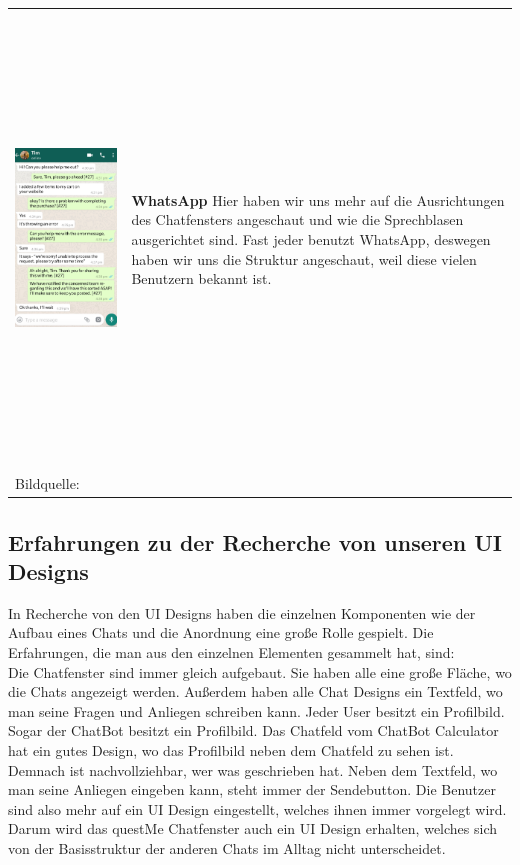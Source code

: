 \begin{tabular}{C{6cm}  L{7cm}}
    \includegraphics[width=\linewidth, height=12cm]{bilder/research pic/Tim Whatsapp.png} & \textbf{WhatsApp} \newline
    Hier haben wir uns mehr auf die Ausrichtungen des Chatfensters angeschaut und wie die Sprechblasen
    ausgerichtet sind. Fast jeder benutzt WhatsApp, deswegen haben wir uns die Struktur angeschaut,
    weil diese vielen Benutzern bekannt ist.                                                                              \\
    Bildquelle:\cite{timwhatsApp} \newline
\end{tabular}

\subsection{Erfahrungen zu der Recherche von unseren UI Designs}
In Recherche von den UI Designs haben die einzelnen Komponenten wie der Aufbau eines Chats und 
die Anordnung eine große Rolle gespielt. Die Erfahrungen, die man aus den einzelnen Elementen gesammelt hat,
sind:
\\

\noindent Die Chatfenster sind immer gleich aufgebaut. 
Sie haben alle eine große Fläche, wo die Chats angezeigt werden. 
Außerdem haben alle Chat Designs ein Textfeld, wo man seine Fragen und Anliegen schreiben kann. 
Jeder User besitzt ein Profilbild. Sogar der ChatBot besitzt ein Profilbild. 
Das Chatfeld vom ChatBot Calculator hat ein gutes Design, wo das Profilbild neben dem Chatfeld zu sehen ist.
Demnach ist nachvollziehbar, wer was geschrieben hat. 
Neben dem Textfeld, wo man seine Anliegen eingeben kann, steht immer der Sendebutton.
Die Benutzer sind also mehr auf ein UI Design eingestellt, welches ihnen immer vorgelegt wird.
Darum wird das questMe Chatfenster auch ein UI Design erhalten, welches sich von der 
Basisstruktur der anderen Chats im Alltag nicht unterscheidet.



